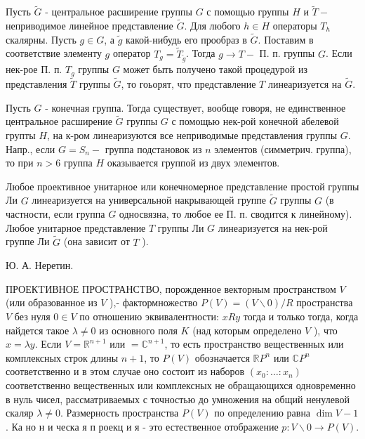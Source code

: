 \documentclass[10pt]{article}
\begin{document}
Пусть $\widetilde{G}$ - центральное расширение группы $G$ с помощью группы $H$ и $\widetilde{T}-$ неприводимое линейное представление $\widetilde{G}$. Для любого $h \in H$ операторы $T_{h}$ скалярны. Пусть $g \in G$, а $\widetilde{g}$ какой-нибудь его прообраз в $\widetilde{G}$. Поставим в соответствие элементу $g$ оператор $T_{g}=\widetilde{T}_{\widetilde{g}}$. Тогда $g \rightarrow T-$ П. п. группы $G$. Если нек-рое П. п. $T_{g}$ группы $G$ может быть получено такой процедурой из представления $\widetilde{T}$ группы $\widetilde{G}$, то гоьорят, что представление $T$ линеаризуется на $\widetilde{G}$.



Пусть $G$ - конечная группа. Тогда существует, вообще говоря, не единственное центральное расширение $\widetilde{G}$ группы $G$ с помощью нек-рой конечной абелевой групты $H$, на к-ром линеаризуются все неприводимые представления группы $G$. Напр., если $G=S_{n}-$ группа подстановок из $n$ элементов (симметрич. группа), то при $n>6$ группа $H$ оказывается группой из двух элементов.



Любое проективное унитарное или конечномерное представление простой группы Ли $G$ линеаризуется на универсальной накрывающей группе $\widetilde{G}$ группы $G$ (в частности, если группа $G$ односвязна, то любое ее П. п. сводится к линейному). Любое унитарное представление $T$ группы Ли $G$ линеаризуется на нек-рой группе Ли $\widetilde{G}$ (она зависит от $T$ ).



Ю. А. Неретин.



ПРОЕКTИВНОЕ ПРОСТРАНСТВО, порожденное векторным пространством $V$ (или образованное из $V$ ),- фактормножество $P(V)=(V \backslash 0) / R$ пространства $V$ без нуля $0 \in V$ по отношению эквивалентности: $x R y$ тогда и только тогда, когда найдется такое $\lambda \neq 0$ из основного поля $K$ (над которым определено $V$ ), что $x=\lambda y$. Если $V=\mathbb{R}^{n+1}$ или $=\mathbb{C}^{n+1}$, то есть пространство вещественных или комплексных строк длины $n+1$, то $P(V)$ обозначается $\mathbb{R} P^{n}$ или $\mathbb{C} P^{n}$ соответственно и в этом случае оно состоит из наборов $\left(x_{0}: \ldots: x_{n}\right)$ соответственно вещественных или комплексных не обращающихся одновременно в нуль чисел, рассматриваемых с точностью до умножения на общий ненулевой скаляр $\lambda \neq 0$. Размерность пространства $P(V)$ по определению равна $\operatorname{dim} V-1$. Ка но н и ческа я п роекц и я - это естественное отображение $p: V \backslash 0 \rightarrow P(V)$.
\end{document}
